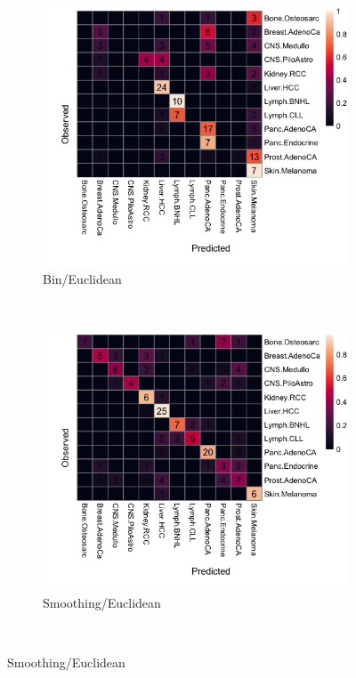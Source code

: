 \begin{figure}[htbp]
    \begin{subfigure}{.5\textwidth}
    \includegraphics[width=\textwidth,height=0.8\textwidth]{graphics/confusion_matrix_bins_euclidean.png}
    \caption{Bin/Euclidean}
    \label{fig:confusion_bin_euclidean}
    \end{subfigure}
    ~
    \begin{subfigure}{.5\textwidth}
    \includegraphics[width=\textwidth,height=0.8\textwidth]{graphics/confusion_matrix_smooth_euclidean.png}
    \caption{Smoothing/Euclidean}
    \label{fig:confusion_smooth_euclidean}
    \end{subfigure} \\
    \vspace{0.5cm}
    

\end{figure}
